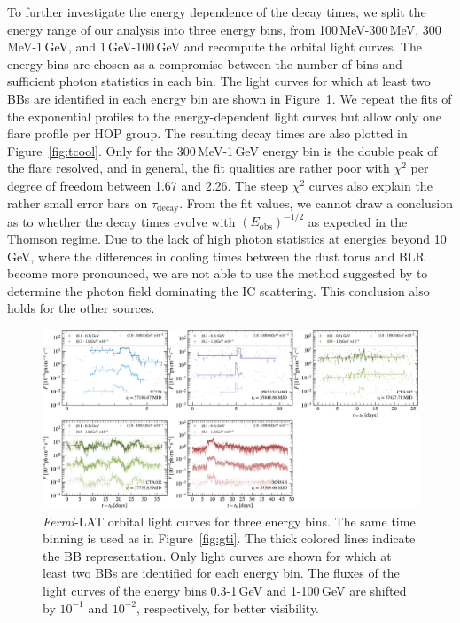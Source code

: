 \documentclass[twocolumn]{aastex62}
\newcommand{\fermiLAT}{\emph{Fermi}-LAT\xspace}
\begin{document}
To further investigate the energy dependence of the decay times, we split the energy range of our analysis into three energy bins, 
 from 100\,MeV-300\,MeV, 300\,MeV-1\,GeV, and 1\,GeV-100\,GeV and recompute the orbital light curves.
The energy bins are chosen as a compromise between the number of bins and sufficient photon statistics in each bin. 
The light curves for which at least two BBs are identified in each energy bin are shown in Figure~\ref{fig:lcebins}.
We repeat the fits of the exponential profiles to the energy-dependent light curves but allow only one flare profile per HOP group. 
The resulting decay times are also plotted in Figure~\ref{fig:tcool}. %
Only for the 300\,MeV-1\,GeV energy bin is the double peak of the flare resolved, and in general, the fit qualities are rather poor with $\chi^2$ per degree of freedom between 1.67 and 2.26.
The steep $\chi^2$ curves also explain the rather small error bars on $\tau_\mathrm{decay}$. 
From the fit values, we cannot draw a conclusion as to whether the decay times evolve with $(E_\mathrm{obs})^{-1/2}$ as expected in the Thomson regime.
Due to the lack of high photon statistics at energies beyond 10\,GeV, where the differences in cooling times between the dust torus and BLR become more pronounced, we are not able to use the method suggested by \citet{2012ApJ...758L..15D} to determine the photon field dominating the IC scattering. 
This conclusion also holds for the other sources. 

\begin{figure}
    \centering
    \includegraphics[width = .9 \linewidth]{lc_ebins_ts9.pdf}
    \caption{\fermiLAT orbital light curves for three energy bins. The same time binning is used as in Figure~\ref{fig:gti}. The thick colored lines indicate the BB representation. Only light curves are shown for which at least two BBs are identified for each energy bin. The fluxes of the light curves of the energy bins 0.3-1\,GeV and 1-100\,GeV are shifted by $10^{-1}$ and $10^{-2}$, respectively, for better visibility. }
    \label{fig:lcebins}
\end{figure}
\end{document}

